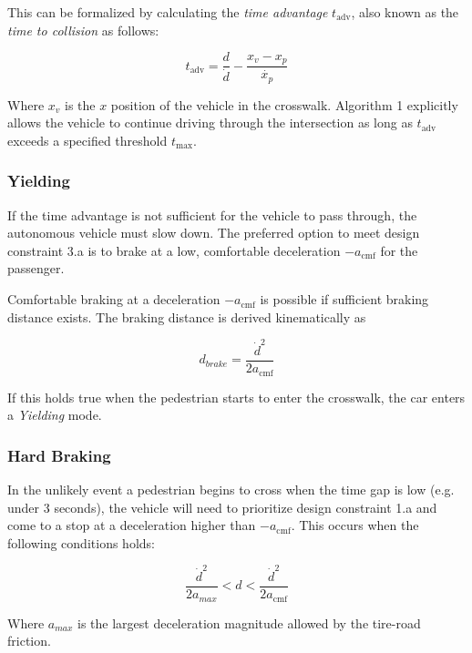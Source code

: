 \documentclass[letterpaper, 10 pt, conference]{ieeeconf}  %
\begin{document}
This can be formalized by calculating the \textit{time advantage} $t_\mathrm{adv}$, also known as the \textit{time to collision} as follows:

\begin{equation}
t_\mathrm{adv} = \frac{d}{\dot{d}} - \frac{x_v - x_p}{\dot{x_p}}
\end{equation}

Where $x_v$ is the $x$ position of the vehicle in the crosswalk. Algorithm 1 explicitly allows the vehicle to continue driving through the intersection as long as $t_\mathrm{adv}$ exceeds a specified threshold $t_\mathrm{max}$. 

\subsubsection{Yielding}

If the time advantage is not sufficient for the vehicle to pass through, the autonomous vehicle must slow down. The preferred option to meet design constraint 3.a is to brake at a low, comfortable deceleration $-a_\mathrm{cmf}$ for the passenger.

Comfortable braking at a deceleration $-a_\mathrm{cmf}$ is possible if sufficient braking distance exists. The braking distance is derived kinematically as 

\begin{equation}
d_{brake} = \frac{\dot{d}^2}{2a_\mathrm{cmf}}
\end{equation}

If this holds true when the pedestrian starts to enter the crosswalk, the car enters a \textit{Yielding} mode. 

\subsubsection{Hard Braking}

In the unlikely event a pedestrian begins to cross when the time gap is low (e.g. under 3 seconds), the vehicle will need to prioritize design constraint 1.a and come to a stop at a deceleration higher than $-a_\mathrm{cmf}$. This occurs when the following conditions holds:

\begin{equation}
\frac{\dot{d}^2}{2a_{max}} < d < \frac{\dot{d}^2}{2a_\mathrm{cmf}}
\end{equation}

Where $a_{max}$ is the largest deceleration magnitude allowed by the tire-road friction. 
\end{document}
